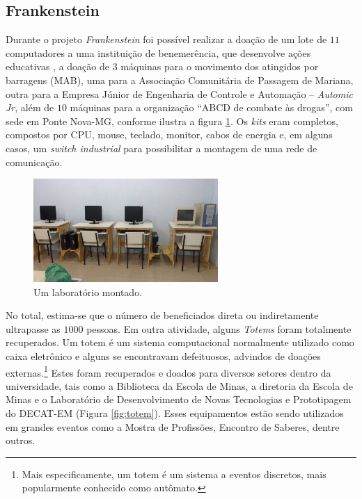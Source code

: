 \documentclass[a4paper]{ifacconf}
\begin{document}
\subsection{Frankenstein}
Durante o projeto \emph{Frankenstein} foi possível realizar a doação de um lote de $11$ computadores a uma instituição de benemerência, que desenvolve ações educativas \citep{ufop2016}, a doação de $3$ máquinas para o movimento dos atingidos por barragens (MAB), uma para a Associação Comunitária de Passagem de Mariana, outra para a Empresa Júnior de Engenharia de Controle e Automação -- \emph{Automic Jr}, além de $10$ máquinas para a organização ``ABCD de combate às drogas'', com sede em Ponte Nova-MG, conforme ilustra a figura \ref{fig:CasaEspirita4}. Os \textit{kits} eram completos, compostos por CPU, mouse, teclado, monitor, cabos de energia e, em alguns casos, um \textit{switch industrial} para possibilitar a montagem de uma rede de comunicação. 

\begin{figure}
 		\centering
 		\includegraphics[width=7cm,angle=0]{figuras/CasaEspirita4.jpg}
 		\caption{Um laboratório montado.}  \label{fig:CasaEspirita4} 
 		\end{figure} 

No total, estima-se que o número de beneficiados direta ou indiretamente ultrapasse as $1000$ pessoas. Em outra atividade, alguns \textit{Totems} foram totalmente recuperados. Um totem é um sistema computacional normalmente utilizado como caixa eletrônico e alguns se encontravam defeituosos, advindos de doações externas.\footnote{Mais especificamente, um totem é um sistema a eventos discretos, mais popularmente conhecido como autômato.} Estes foram recuperados e doados para diversos setores dentro da universidade, tais como a Biblioteca da Escola de Minas, a diretoria da Escola de Minas e o Laboratório de Desenvolvimento de Novas Tecnologias e Prototipagem do DECAT-EM (Figura \ref{fig:totem}). Esses equipamentos estão sendo utilizados em grandes eventos como a Mostra de Profissões, Encontro de Saberes, dentre outros. 
\end{document}
